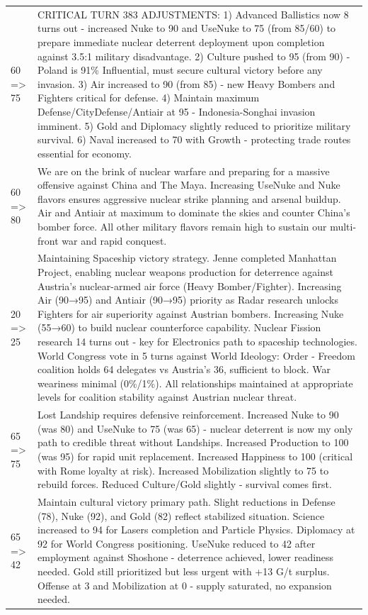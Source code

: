\begin{longtable}{p{}p{}}
60 => 75 & CRITICAL TURN 383 ADJUSTMENTS: 1) Advanced Ballistics now 8 turns out - increased Nuke to 90 and UseNuke to 75 (from 85/60) to prepare immediate nuclear deterrent deployment upon completion against 3.5:1 military disadvantage. 2) Culture pushed to 95 (from 90) - Poland is 91\% Influential, must secure cultural victory before any invasion. 3) Air increased to 90 (from 85) - new Heavy Bombers and Fighters critical for defense. 4) Maintain maximum Defense/CityDefense/Antiair at 95 - Indonesia-Songhai invasion imminent. 5) Gold and Diplomacy slightly reduced to prioritize military survival. 6) Naval increased to 70 with Growth - protecting trade routes essential for economy. \\
60 => 80 & We are on the brink of nuclear warfare and preparing for a massive offensive against China and The Maya. Increasing UseNuke and Nuke flavors ensures aggressive nuclear strike planning and arsenal buildup. Air and Antiair at maximum to dominate the skies and counter China's bomber force. All other military flavors remain high to sustain our multi-front war and rapid conquest. \\
20 => 25 & Maintaining Spaceship victory strategy. Jenne completed Manhattan Project, enabling nuclear weapons production for deterrence against Austria's nuclear-armed air force (Heavy Bomber/Fighter). Increasing Air (90→95) and Antiair (90→95) priority as Radar research unlocks Fighters for air superiority against Austrian bombers. Increasing Nuke (55→60) to build nuclear counterforce capability. Nuclear Fission research 14 turns out - key for Electronics path to spaceship technologies. World Congress vote in 5 turns against World Ideology: Order - Freedom coalition holds 64 delegates vs Austria's 36, sufficient to block. War weariness minimal (0\%/1\%). All relationships maintained at appropriate levels for coalition stability against Austrian nuclear threat. \\
65 => 75 & Lost Landship requires defensive reinforcement. Increased Nuke to 90 (was 80) and UseNuke to 75 (was 65) - nuclear deterrent is now my only path to credible threat without Landships. Increased Production to 100 (was 95) for rapid unit replacement. Increased Happiness to 100 (critical with Rome loyalty at risk). Increased Mobilization slightly to 75 to rebuild forces. Reduced Culture/Gold slightly - survival comes first. \\
65 => 42 & Maintain cultural victory primary path. Slight reductions in Defense (78), Nuke (92), and Gold (82) reflect stabilized situation. Science increased to 94 for Lasers completion and Particle Physics. Diplomacy at 92 for World Congress positioning. UseNuke reduced to 42 after employment against Shoshone - deterrence achieved, lower readiness needed. Gold still prioritized but less urgent with +13 G/t surplus. Offense at 3 and Mobilization at 0 - supply saturated, no expansion needed. \\

\end{longtable}
